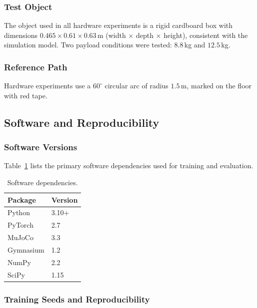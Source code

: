 \subsubsection{Test Object}

The object used in all hardware experiments is a rigid cardboard box with dimensions $0.465 \times 0.61 \times 0.63$\,m (width $\times$ depth $\times$ height), consistent with the simulation model.
Two payload conditions were tested: $8.8$\,kg and $12.5$\,kg.

\subsubsection{Reference Path}

Hardware experiments use a $60^\circ$ circular arc of radius $1.5$\,m, marked on the floor with red tape.

\subsection{Software and Reproducibility}
\label{app:software}

\subsubsection{Software Versions}

Table~\ref{tab:software} lists the primary software dependencies used for training and evaluation.

\begin{table}[h]
\centering
\caption{Software dependencies.}
\label{tab:software}
\begin{tabular}{ll}
\toprule
\textbf{Package} & \textbf{Version} \\
\midrule
Python     & 3.10+  \\
PyTorch    & 2.7    \\
MuJoCo     & 3.3    \\
Gymnasium  & 1.2    \\
NumPy      & 2.2    \\
SciPy      & 1.15   \\
\bottomrule
\end{tabular}
\end{table}

\subsubsection{Training Seeds and Reproducibility}

